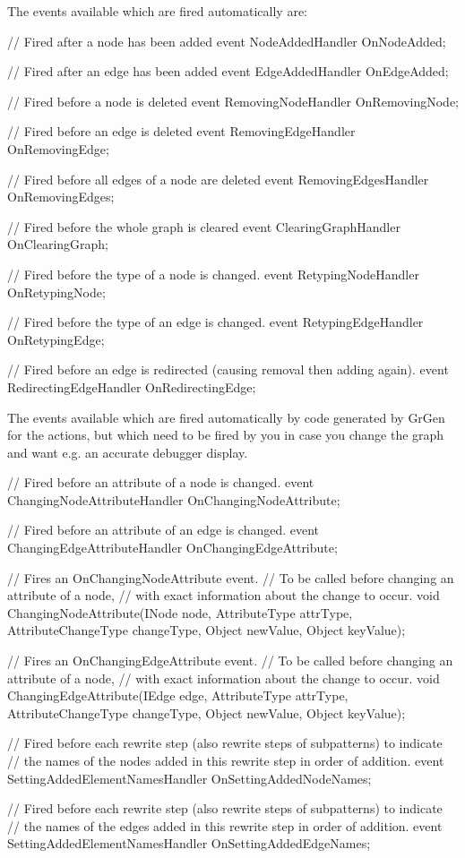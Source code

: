 The events available which are fired automatically are:
\begin{csharplet}
// Fired after a node has been added
event NodeAddedHandler OnNodeAdded;

// Fired after an edge has been added
event EdgeAddedHandler OnEdgeAdded;

// Fired before a node is deleted
event RemovingNodeHandler OnRemovingNode;

// Fired before an edge is deleted
event RemovingEdgeHandler OnRemovingEdge;

// Fired before all edges of a node are deleted
event RemovingEdgesHandler OnRemovingEdges;

// Fired before the whole graph is cleared
event ClearingGraphHandler OnClearingGraph;

// Fired before the type of a node is changed.
event RetypingNodeHandler OnRetypingNode;

// Fired before the type of an edge is changed.
event RetypingEdgeHandler OnRetypingEdge;

// Fired before an edge is redirected (causing removal then adding again).
event RedirectingEdgeHandler OnRedirectingEdge;
\end{csharplet}

The events available which are fired automatically by code generated by GrGen for the actions, but which need to be fired by you in case you change the graph and want e.g. an accurate debugger display.

\begin{csharplet}
// Fired before an attribute of a node is changed.
event ChangingNodeAttributeHandler OnChangingNodeAttribute;

// Fired before an attribute of an edge is changed.
event ChangingEdgeAttributeHandler OnChangingEdgeAttribute;

// Fires an OnChangingNodeAttribute event.
// To be called before changing an attribute of a node,
// with exact information about the change to occur.
void ChangingNodeAttribute(INode node, AttributeType attrType,
    AttributeChangeType changeType, Object newValue, Object keyValue);

// Fires an OnChangingEdgeAttribute event.
// To be called before changing an attribute of a node,
// with exact information about the change to occur.
void ChangingEdgeAttribute(IEdge edge, AttributeType attrType,
    AttributeChangeType changeType, Object newValue, Object keyValue);        

// Fired before each rewrite step (also rewrite steps of subpatterns) to indicate 
// the names of the nodes added in this rewrite step in order of addition.
event SettingAddedElementNamesHandler OnSettingAddedNodeNames;

// Fired before each rewrite step (also rewrite steps of subpatterns) to indicate 
// the names of the edges added in this rewrite step in order of addition.
event SettingAddedElementNamesHandler OnSettingAddedEdgeNames;
\end{csharplet}

